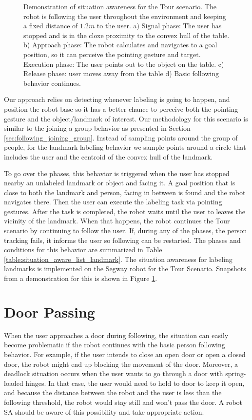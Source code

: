 \begin{figure}[ht!]
{        }
    \caption{Demonstration of situation awareness for the Tour scenario. The robot is following the user throughout the environment and keeping a fixed distance of $1.2m$ to the user. a) Signal phase: The user has stopped and is in the cloxe proximity to the convex hull of the table. b) Approach phase: The robot calculates and navigates to a goal position, so it can perceive the pointing gesture and target. Execution phase: The user points out to the object on the table. c) Release phase: user moves away from the table d) Basic following behavior continues.}
   \label{fig:situtation_aware_landmark_labeling}
\end{figure}

Our approach relies on detecting whenever labeling is going to happen, and position the robot base so it has a better chance to perceive both the pointing gesture and the object/landmark of interest. Our methodology for this scenario is similar to the joining a group behavior as presented in Section \ref{sec:following_joining_group}. Instead of sampling points around the group of people, for the landmark labeling behavior we sample points around a circle that includes the user and the centroid of the convex hull of the landmark.

To go over the phases, this behavior is triggered when the user has stopped nearby an unlabeled landmark or object and facing it. A goal position that is close to both the landmark and person, facing in between is found and the robot navigates there. Then the user can execute the labeling task via pointing gestures. After the task is completed, the robot waits until the user to leaves the vicinity of the landmark. When that happens, the robot continues the Tour scenario by continuing to follow the user. If, during any of the phases, the person tracking fails, it informs the user so following can be restarted. The phases and conditions for this behavior are summarized in Table \ref{table:situation_aware_list_landmark}. The situation awareness for labeling landmarks is implemented on the Segway robot for the Tour Scenario. Snapshots from a demonstration for this is shown in Figure \ref{fig:situtation_aware_landmark_labeling}.

\section{Door Passing}
\label{sec:following_door_passing}

When the user approaches a door during following, the situation can easily become problematic if the robot continues with the basic person following behavior. For example, if the user intends to close an open door or open a closed door, the robot might end up blocking the movement of the door. Moreover, a deadlock situation occurs when the user wants to go through a door with spring-loaded hinges. In that case, the user would need to hold to door to keep it open, and because the distance between the robot and the user is less than the following threshold, the robot would stay still and won't pass the door. A robot SA should be aware of this possibility and take appropriate action. 

